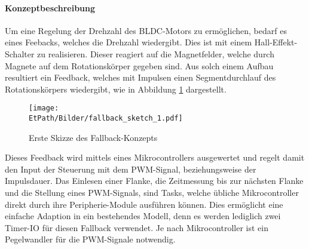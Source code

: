 \paragraph{Konzeptbeschreibung}$~~$\vspace{2mm}\\
\fi
Um eine Regelung der Drehzahl des BLDC-Motors zu ermöglichen, bedarf es eines
Feebacks, welches die Drehzahl wiedergibt. Dies ist mit einem
Hall-Effekt-Schalter zu realisieren. Dieser reagiert auf die Magnetfelder,
welche durch Magnete auf dem Rotationskörper gegeben sind. Aus solch einem
Aufbau resultiert ein Feedback, welches mit Impulsen einen Segmentdurchlauf
des Rotationskörpers wiedergibt, wie in Abbildung \ref{fig:fallback-sketch}
dargestellt.
\begin{figure}[h!]
	\centering
	\texttt{[image: \\EtPath/Bilder/fallback\_sketch\_1.pdf]}
	\caption{Erste Skizze des Fallback-Konzepts}
	\label{fig:fallback-sketch}
\end{figure}
Dieses Feedback wird mittels eines Mikrocontrollers ausgewertet und regelt
damit den Input der Steuerung mit dem PWM-Signal, beziehungsweise der Impulsdauer.
Das Einlesen einer Flanke, die Zeitmessung bis zur nächsten Flanke und die
Stellung eines PWM-Signals, sind Tasks, welche übliche Mikrocontroller direkt
durch ihre Peripherie-Module ausführen können. Dies ermöglicht eine einfache
Adaption in ein bestehendes Modell, denn es werden lediglich zwei Timer-IO
für diesen Fallback verwendet. Je nach Mikrocontroller ist ein Pegelwandler
für die PWM-Signale notwendig.
